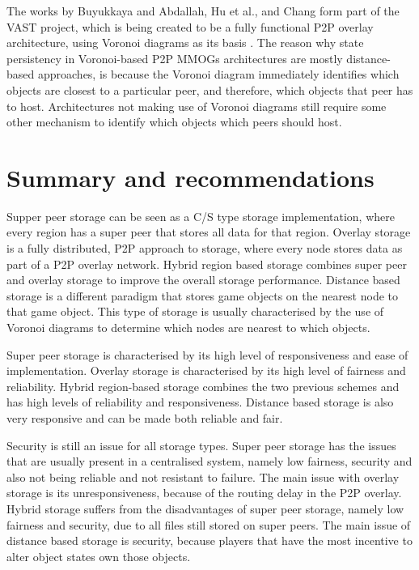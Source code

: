 The works by Buyukkaya and Abdallah, Hu et al., and Chang form part of the VAST project, which is being created to be a fully functional P2P overlay
architecture, using Voronoi diagrams as its basis \cite{VAST}. The reason why state persistency in Voronoi-based P2P MMOGs architectures are mostly
distance-based approaches, is because the Voronoi diagram immediately identifies which objects are closest to a particular peer, and therefore, which
objects that peer has to host. Architectures not making use of Voronoi diagrams still require some other mechanism to identify which objects which
peers should host.

\section{Summary and recommendations}
\label{recommendations}

Supper peer storage can be seen as a C/S type storage implementation, where every region has a super peer that stores all data for that region.
Overlay storage is a fully distributed, P2P approach to storage, where every node stores data as part of a P2P overlay network. Hybrid region based
storage combines super peer and overlay storage to improve the overall storage performance. Distance based storage is a different paradigm that
stores game objects on the nearest node to that game object. This type of storage is usually characterised by the use of Voronoi diagrams to
determine which nodes are nearest to which objects.

Super peer storage is characterised by its high level of responsiveness and ease of implementation. Overlay storage is characterised by its high
level of fairness and reliability. Hybrid region-based storage combines the two previous schemes and has high levels of reliability and
responsiveness. Distance based storage is also very responsive and can be made both reliable and fair.

Security is still an issue for all storage types. Super peer storage has the issues that are usually present in a centralised system, namely low
fairness, security and also not being reliable and not resistant to failure. The main issue with overlay storage is its unresponsiveness, because of
the routing delay in the P2P overlay. Hybrid storage suffers from the disadvantages of super peer storage, namely low fairness and security, due to
all files still stored on super peers. The main issue of distance based storage is security, because players that have the most incentive to alter
object states own those objects.

